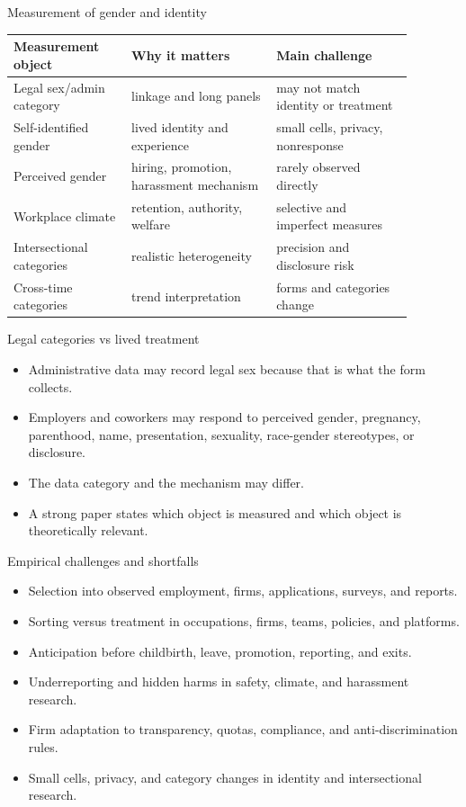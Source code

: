 \documentclass[aspectratio=169,11pt]{beamer}
\begin{document}
\begin{frame}{Measurement of gender and identity}
\scriptsize
\begin{tabular}{p{0.26\linewidth} p{0.32\linewidth} p{0.30\linewidth}}
\toprule
Measurement object & Why it matters & Main challenge \\
\midrule
Legal sex/admin category & linkage and long panels & may not match identity or treatment \\
Self-identified gender & lived identity and experience & small cells, privacy, nonresponse \\
Perceived gender & hiring, promotion, harassment mechanism & rarely observed directly \\
Workplace climate & retention, authority, welfare & selective and imperfect measures \\
Intersectional categories & realistic heterogeneity & precision and disclosure risk \\
Cross-time categories & trend interpretation & forms and categories change \\
\bottomrule
\end{tabular}
\end{frame}

\begin{frame}{Legal categories vs lived treatment}
\begin{itemize}
    \item Administrative data may record legal sex because that is what the form collects.
    \item Employers and coworkers may respond to perceived gender, pregnancy, parenthood, name, presentation, sexuality, race-gender stereotypes, or disclosure.
    \item The data category and the mechanism may differ.
    \item A strong paper states which object is measured and which object is theoretically relevant.
\end{itemize}
\end{frame}

\begin{frame}{Empirical challenges and shortfalls}
\begin{itemize}
    \item Selection into observed employment, firms, applications, surveys, and reports.
    \item Sorting versus treatment in occupations, firms, teams, policies, and platforms.
    \item Anticipation before childbirth, leave, promotion, reporting, and exits.
    \item Underreporting and hidden harms in safety, climate, and harassment research.
    \item Firm adaptation to transparency, quotas, compliance, and anti-discrimination rules.
    \item Small cells, privacy, and category changes in identity and intersectional research.
\end{itemize}
\end{frame}
\end{document}
